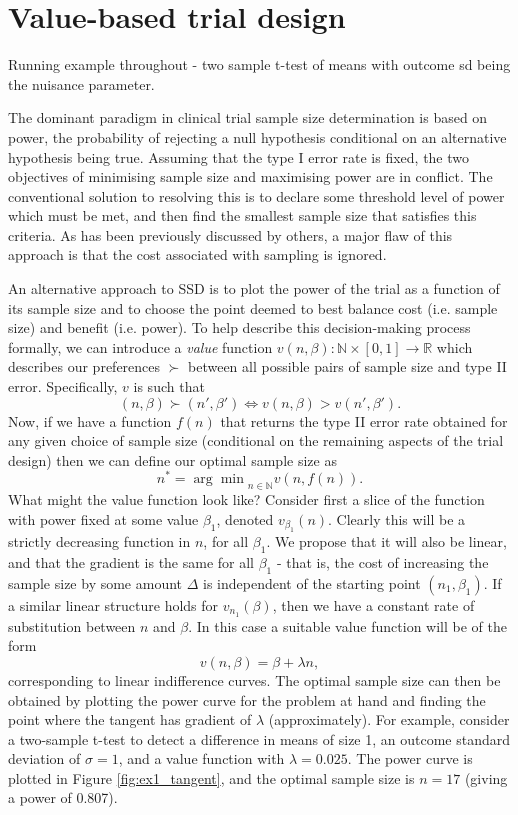 \documentclass[sagev]{sagej}
\begin{document}
\section{Value-based trial design}

Running example throughout - two sample t-test of means with outcome sd being the nuisance parameter.

The dominant paradigm in clinical trial sample size determination is based on power, the probability of rejecting a null hypothesis conditional on an alternative hypothesis being true. Assuming that the type I error rate is fixed, the two objectives of minimising sample size and maximising power are in conflict. The conventional solution to resolving this is to declare some threshold level of power which must be met, and then find the smallest sample size that satisfies this criteria. As has been previously discussed by others, a major flaw of this approach is that the cost associated with sampling is ignored.

An alternative approach to SSD is to plot the power of the trial as a function of its sample size and to choose the point deemed to best balance cost (i.e. sample size) and benefit (i.e. power). To help describe this decision-making process formally, we can introduce a \emph{value} function $v(n, \beta): \mathbb{N} \times [0,1] \rightarrow \mathbb{R}$ which describes our preferences $\succ$ between all possible pairs of sample size and type II error. Specifically, $v$ is such that
$$
(n, \beta) \succ (n', \beta') \Leftrightarrow v(n, \beta) > v(n', \beta').
$$
Now, if we have a function $f(n)$ that returns the type II error rate obtained for any given choice of sample size (conditional on the remaining aspects of the trial design) then we can define our optimal sample size as
$$
n^* = {\arg\min}_{n \in \mathbb{N}} v(n, f(n)).
$$
What might the value function look like? Consider first a slice of the function with power fixed at some value $\beta_1$, denoted $v_{\beta_1}(n)$. Clearly this will be a strictly decreasing function in $n$, for all $\beta_1$. We propose that it will also be linear, and that the gradient is the same for all $\beta_1$ - that is, the cost of increasing the sample size by some amount $\Delta$ is independent of the starting point $(n_1, \beta_1)$. If a similar linear structure holds for $v_{n_1}(\beta)$, then we have a constant rate of substitution between $n$ and $\beta$. In this case a suitable value function will be of the form 
$$
v(n, \beta) = \beta + \lambda n,
$$
corresponding to linear indifference curves. The optimal sample size can then be obtained by plotting the power curve for the problem at hand and finding the point where the tangent has gradient of $\lambda$ (approximately). For example, consider a two-sample t-test to detect a difference in means of size 1, an outcome standard deviation of $\sigma = 1$, and a value function with $\lambda = 0.025$. The power curve is plotted in Figure \ref{fig:ex1_tangent}, and the optimal sample size is $n = 17$ (giving a power of 0.807). 
\end{document}
